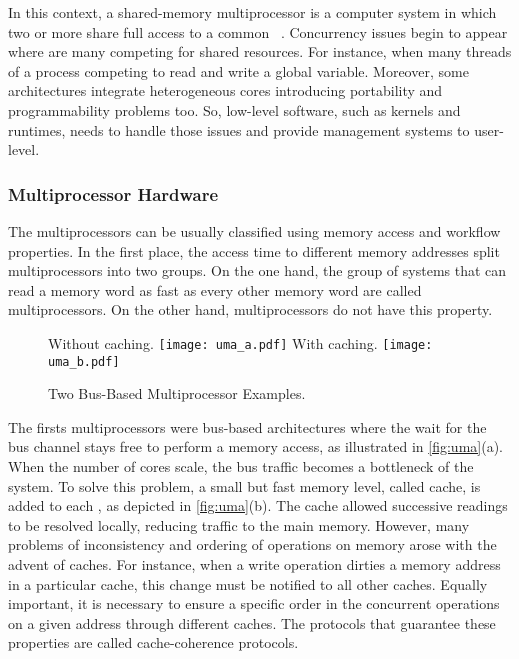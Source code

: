 		In this context, a shared-memory multiprocessor is a computer system
		in which two or more \cpus share full access to a common \ram~\cite{tanenbaum:4ed}.
		Concurrency issues begin to appear where are many \cpus competing for
		shared resources.
		For instance, when many threads of a process competing to read and write a global variable.
		Moreover, some architectures integrate heterogeneous cores introducing portability
		and programmability problems too.
		So, low-level software, such as \os kernels and runtimes, needs to handle those
		issues and provide management systems to user-level.

		\subsubsection{Multiprocessor Hardware}
		\label{sec.multiprocessor-hw}

			The multiprocessors can be usually classified using memory access
			and workflow properties.
			In the first place, the access time to different memory addresses
			split multiprocessors into two groups.
			On the one hand, the group of systems that can read a memory word
			as fast as every other memory word are called \uma multiprocessors.
			On the other hand, \numa multiprocessors do not have this property.

			\begin{figure}[!tb]
				\centering%
				\caption{Two Bus-Based \uma Multiprocessor Examples.}%
				\label{fig:uma}%

					{Without caching.}%
					{\texttt{[image: uma\_a.pdf]}}%
				\hspace{1.5cm}%
					{With caching.}%
					{\texttt{[image: uma\_b.pdf]}}%

			\end{figure}

			The firsts \uma multiprocessors were bus-based architectures where
			the \cpu wait for the bus channel stays free to perform a memory
			access, as illustrated in \autoref{fig:uma}(a).
			When the number of cores scale, the bus traffic becomes a
			bottleneck of the system.
			To solve this problem, a small but fast memory level, called cache,
			is added to each \cpu, as depicted in \autoref{fig:uma}(b).
			The cache allowed successive readings to be resolved locally,
			reducing traffic to the main memory.
			However, many problems of inconsistency and ordering of operations
			on memory arose with the advent of caches.
			For instance, when a write operation dirties a memory address in
			a particular cache, this change must be notified to all other caches.
			Equally important, it is necessary to ensure a specific order in
			the concurrent operations on a given address through different caches.
			The protocols that guarantee these properties are called cache-coherence protocols.


